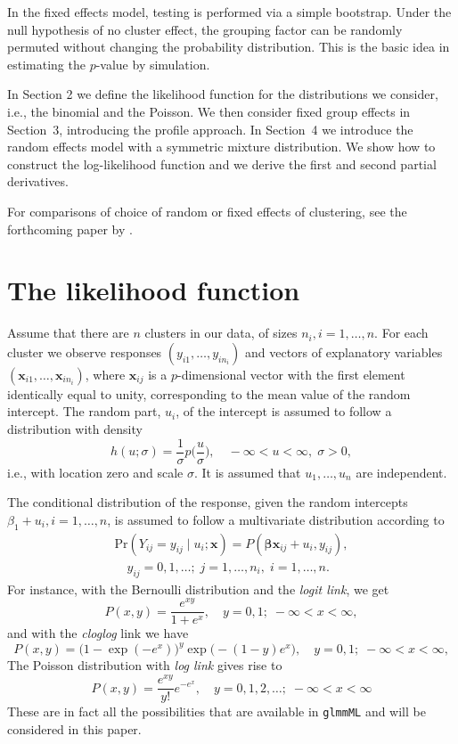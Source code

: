 \documentclass[a4paper,11pt]{article}
\newcommand{\bx}{\ensuremath{\mathbf{x}}}
\newcommand{\bb}{\ensuremath{\boldsymbol{\beta}}}
\newcommand{\py}{\ensuremath{P(\bb\bx_{ij} + u_i, y_{ij})}}
\newcommand{\be}{\begin{equation}}
\newcommand{\ee}{\end{equation}}
\begin{document}
In the fixed effects model, testing is performed via a simple bootstrap. 
Under the null hypothesis of no cluster effect, the grouping factor can be
randomly permuted without changing the probability distribution. This is
the basic idea in estimating the $p$-value by simulation.

In Section 2 we define the likelihood function for the distributions we
consider, i.e., the binomial and the Poisson. We then consider fixed group
effects in Section~3, introducing the profile approach. In Section~4 we
introduce the random effects model with a symmetric mixture distribution. We
show how to construct the log-likelihood 
function and we derive the first and second partial derivatives. 

For comparisons of choice of random or fixed effects
of clustering, see the forthcoming paper by \cite{gbhh11}.

\section{The likelihood function}

Assume that there are $n$ clusters in our data, of sizes $n_i, i = 1,
\ldots, n$. For each cluster we observe
responses $(y_{i1}, \ldots, y_{in_i})$ and vectors of explanatory variables
$(\bx_{i1}, \ldots, \bx_{in_i})$, where $\bx_{ij}$ is a $p$-dimensional
vector with the first element identically equal to unity, corresponding to
the mean value of the random intercept. The random part, $u_i$, of the
intercept is 
assumed to follow a distribution with density 
\be
h(u; \sigma) = \frac{1}{\sigma}p\biggl(\frac{u}{\sigma}\biggr), \quad -\infty
< u < \infty,\; \sigma > 0,
\ee 
i.e., with location zero and scale $\sigma$. It is assumed that $u_1, \ldots, u_n$
are independent.

The conditional distribution of the response, given the random intercepts
$\beta_1 + u_i, i = 1, \ldots, n$, is assumed to follow a multivariate
distribution according to
\begin{multline}
\mbox{Pr}(Y_{ij} = y_{ij} \mid u_i; \bx) = \py, \\ 
\quad y_{ij} = 0, 1, \ldots; \; j = 1, \ldots, n_i, \; i = 1, \ldots, n.
\end{multline}
For instance, with the Bernoulli distribution and the
\emph{logit link}, we get
\begin{equation*}
P(x, y) = \frac{e^{xy}}{1 + e^x}, \quad y = 0, 1; \; -\infty < x < \infty,
\end{equation*}
and with the \emph{cloglog} link we have
\begin{equation*}
P(x, y) = \bigl(1 - \exp(-e^x)\bigr)^y \exp\bigl(-(1-y)e^x\bigr),
 \quad y = 0, 1; \; -\infty < x < \infty,
\end{equation*}
The Poisson distribution with \emph{log link} gives rise to
\begin{equation*}
P(x, y) = \frac{e^{xy}}{y!} e^{-e^x}, \quad y = 0, 1, 2, \ldots; \; -\infty < x
< \infty
\end{equation*}
These are in fact all the possibilities that are available in {\tt glmmML}
and will be considered in this paper. 
\end{document}
